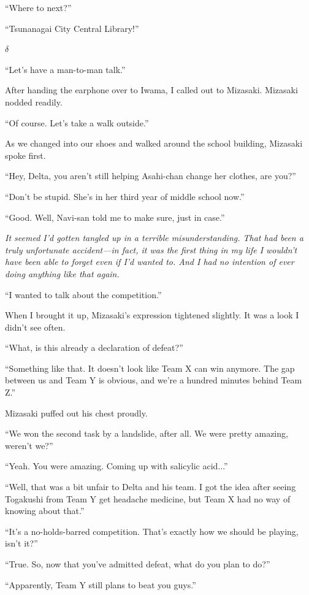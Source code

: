 \documentclass[
    a4paper,
    12pt,
    twoside,
    openany,
    UTF8,
    fontset=windows
]{ctexbook}
\begin{document}
``Where to next?''

``Tsunanagai City Central Library!''

$\delta$

``Let's have a man-to-man talk.''

After handing the earphone over to Iwama, I called out to Mizasaki. Mizasaki nodded readily.

``Of course. Let's take a walk outside.''

As we changed into our shoes and walked around the school building, Mizasaki spoke first.

``Hey, Delta, you aren't still helping Asahi-chan change her clothes, are you?''

``Don't be stupid. She's in her third year of middle school now.''

``Good. Well, Navi-san told me to make sure, just in case.''

\textit{It seemed I'd gotten tangled up in a terrible misunderstanding. That had been a truly unfortunate accident---in fact, it was the first thing in my life I wouldn't have been able to forget even if I'd wanted to. And I had no intention of ever doing anything like that again.}

``I wanted to talk about the competition.''

When I brought it up, Mizasaki's expression tightened slightly. It was a look I didn't see often.

``What, is this already a declaration of defeat?''

``Something like that. It doesn't look like Team X can win anymore. The gap between us and Team Y is obvious, and we're a hundred minutes behind Team Z.''

Mizasaki puffed out his chest proudly.

``We won the second task by a landslide, after all. We were pretty amazing, weren't we?''

``Yeah. You were amazing. Coming up with salicylic acid...''

``Well, that was a bit unfair to Delta and his team. I got the idea after seeing Togakushi from Team Y get headache medicine, but Team X had no way of knowing about that.''

``It's a no-holds-barred competition. That's exactly how we should be playing, isn't it?''

``True. So, now that you've admitted defeat, what do you plan to do?''

``Apparently, Team Y still plans to beat you guys.''
\end{document}
